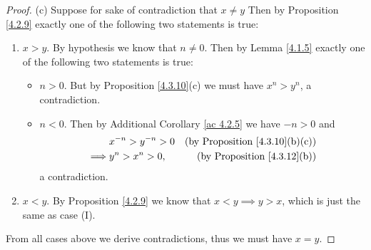 \begin{proof}{(c)}
    Suppose for sake of contradiction that \(x \neq y\)
    Then by Proposition \ref{4.2.9} exactly one of the following two statements is true:
    \begin{enumerate}[label=(\Roman*)]
        \item \(x > y\).
              By hypothesis we know that \(n \neq 0\).
              Then by Lemma \ref{4.1.5} exactly one of the following two statements is true:
              \begin{itemize}
                  \item \(n > 0\).
                        But by Proposition \ref{4.3.10}(c) we must have \(x^n > y^n\), a contradiction.
                  \item \(n < 0\).
                        Then by Additional Corollary \ref{ac 4.2.5} we have \(-n > 0\) and
                        \begin{align*}
                                     & x^{-n} > y^{-n} > 0 & \text{(by Proposition \ref{4.3.10}(b)(c))} \\
                            \implies & y^n > x^n > 0,      & \text{(by Proposition \ref{4.3.12}(b))}
                        \end{align*}
                        a contradiction.
              \end{itemize}
        \item \(x < y\).
              By Proposition \ref{4.2.9} we know that \(x < y \implies y > x\), which is just the same as case (I).
    \end{enumerate}
    From all cases above we derive contradictions, thus we must have \(x = y\).
\end{proof}

